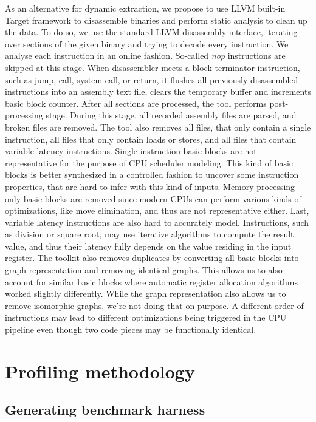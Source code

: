 As an alternative for dynamic extraction, we propose to use LLVM built-in Target framework to 
disassemble binaries and perform static analysis to clean up the data. To do so, we use the standard 
LLVM disassembly interface, iterating over sections of the given binary and trying to decode every 
instruction. We analyse each instruction in an online fashion. So-called \textit{nop} instructions are skipped 
at this stage. When disassembler meets a block terminator instruction, such as jump, call, system 
call, or return, it flushes all previously disassembled instructions into an assembly text file, 
clears the temporary buffer and increments basic block counter. After all sections are processed, 
the tool performs post-processing stage. During this stage, all recorded assembly files are parsed, 
and broken files are removed. The tool also removes all files, that only contain a single instruction, 
all files that only contain loads or stores, and all files that contain variable latency instructions. 
Single-instruction basic blocks are not representative for the purpose of CPU scheduler modeling. 
This kind of basic blocks is better synthesized in a controlled fashion to uncover some instruction 
properties, that are hard to infer with this kind of inputs. Memory processing-only basic blocks are 
removed since modern CPUs can perform various kinds of optimizations, like move 
elimination\cite{Intel64IA322022}, and thus are not representative either. Last, variable latency 
instructions are also hard to accurately model. Instructions, such as division or square root, may 
use iterative algorithms to compute the result value, and thus their latency fully depends on the 
value residing in the input register. The toolkit also removes duplicates by converting all basic 
blocks into graph representation and removing identical graphs. This allows us to also account for 
similar basic blocks where automatic register allocation algorithms worked slightly differently. 
While the graph representation also allows us to remove isomorphic graphs, we're not doing that on purpose. 
A different order of instructions may lead to different optimizations being triggered in the CPU pipeline 
even though two code pieces may be functionally identical.

\section{Profiling methodology}

\subsection{Generating benchmark harness}

